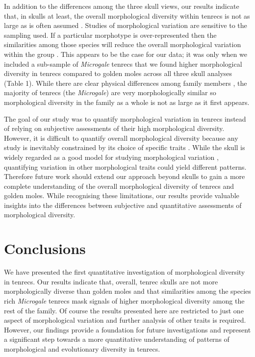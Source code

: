 \documentclass[12pt,a4paper]{article}
\begin{document}
	In addition to the differences among the three skull views, our results indicate that, in skulls at least, the overall morphological diversity within tenrecs is not as large as is often assumed \citep[e.g.][]{Eisenberg1969, Olson2013}. Studies of morphological variation are sensitive to the sampling used. If a particular morphotype is over-represented then the similarities among those species will reduce the overall morphological variation within the group \citep{Foote1991}. This appears to be the case for our data; it was only when we included a sub-sample of \textit{Microgale} tenrecs that we found higher morphological diversity in tenrecs compared to golden moles across all three skull analyses (Table 1).
	While there are clear physical differences among family members \citep{Olson2013, Eisenberg1969}, the majority of tenrecs (the \textit{Microgale}) are very morphologically similar \citep{Jenkins2003} so morphological diversity in the family as a whole is not as large as it first appears.  
	
	The goal of our study was to quantify morphological variation in tenrecs instead of relying on subjective assessments of their high morphological diversity. However, it is difficult to quantify overall morphological diversity because any study is inevitably constrained by its choice of specific traits \citep{Roy1997}. While the skull is widely regarded as a good model for studying morphological variation \citep[e.g.][]{Blagojevic2011, Flores2010, Giannini2010}, quantifying variation in other morphological traits could yield different patterns. Therefore future work should extend our approach beyond skulls to gain a more complete understanding of the overall morphological diversity of tenrecs and golden moles.
	While recognising these limitations, our results provide valuable insights into the differences between subjective and quantitative assessments of morphological diversity. 

\section{Conclusions}
	We have presented the first quantitative investigation of morphological diversity in tenrecs. Our results indicate that, overall, tenrec skulls are not more morphologically diverse than golden moles and that similarities among the species rich \textit{Microgale} tenrecs mask signals of higher morphological diversity among the rest of the family. Of course the results presented here are restricted to just one aspect of morphological variation and further analysis of other traits is required. However, our findings provide a foundation for future investigations and represent a significant step towards a more quantitative understanding of patterns of morphological and evolutionary diversity in tenrecs. 
\end{document}
